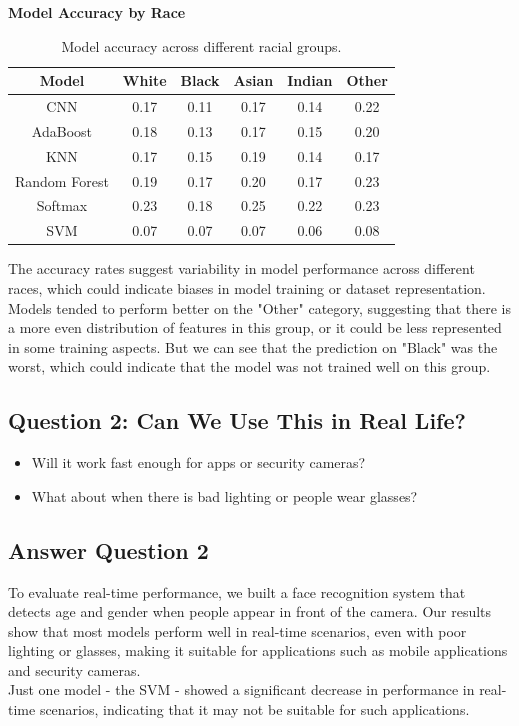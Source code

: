 \documentclass{article}
\begin{document}
\textbf{Model Accuracy by Race}
\begin{table}[H]
    \centering
    \renewcommand{\arraystretch}{1.2}
    \begin{tabular}{|c|c|c|c|c|c|}
    \hline
    \textbf{Model} & \textbf{White} & \textbf{Black} & \textbf{Asian} & \textbf{Indian} & \textbf{Other} \\
    \hline
    CNN & 0.17 & 0.11 & 0.17 & 0.14 & 0.22 \\
    \hline
    AdaBoost & 0.18 & 0.13 & 0.17 & 0.15 & 0.20 \\
    \hline
    KNN & 0.17 & 0.15 & 0.19 & 0.14 & 0.17 \\
    \hline
    Random Forest & 0.19 & 0.17 & 0.20 & 0.17 & 0.23 \\
    \hline
    Softmax & 0.23 & 0.18 & 0.25 & 0.22 & 0.23 \\
    \hline
    SVM & 0.07 & 0.07 & 0.07 & 0.06 & 0.08 \\
    \hline
    \end{tabular}
    \caption{Model accuracy across different racial groups.}
    \label{tab:accuracy_race}
\end{table}

The accuracy rates suggest variability in model performance across different races, which could indicate biases in model training or dataset representation. Models tended to perform better on the "Other" category, suggesting that there is a more even distribution of features in this group, or it could be less represented in some training aspects. But we can see that the prediction on "Black" was the worst, which could indicate that the model was not trained well on this group.


\subsection*{Question 2: Can We Use This in Real Life?}
\begin{itemize}[leftmargin=1.6cm]
    \item Will it work fast enough for apps or security cameras?
    \item What about when there is bad lighting or people wear glasses?
\end{itemize}

\subsection*{Answer Question 2}
To evaluate real-time performance, we built a face recognition system that detects age and gender when people appear in front of the camera.
Our results show that most models perform well in real-time scenarios, even with poor lighting or glasses, making it suitable for applications such as mobile applications and security cameras.  
\\ Just one model - the SVM - showed a significant decrease in performance in real-time scenarios, indicating that it may not be suitable for such applications.
 
\end{document}
